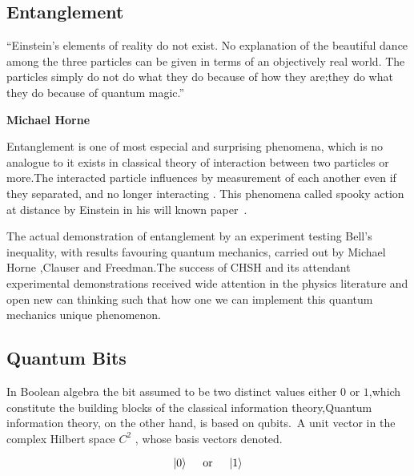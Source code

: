 \subsection{Entanglement}
\begin{center}
“Einstein’s elements of reality do not exist. No explanation of the beautiful dance among the 	three particles can be given in terms of an objectively real world. The particles
simply do not do what they do because of how they are;they do what they do because of quantum magic.”
\end{center}
\begin{flushright}
\textbf{Michael Horne}
\end{flushright}
Entanglement is one of most especial and surprising phenomena, which is no analogue to it exists in classical theory of  interaction between two particles or more\citep{PhysRevLett.78.5022}.The interacted particle influences by measurement of each another even if they separated,  and no longer interacting . This phenomena  called spooky action at distance by Einstein in his will known paper~\cite{EPR}.


The actual demonstration of entanglement by an experiment testing Bell’s inequality, with results favouring quantum mechanics, carried out by Michael Horne ,Clauser and Freedman\citep{PhysRevLett.23.880}.The success of CHSH and its attendant experimental demonstrations received wide attention in the physics literature and open new can thinking such that how one we can implement this quantum mechanics unique phenomenon.
\subsection{Quantum Bits}

In Boolean algebra the bit assumed to be  two distinct values either $0 $ or $1$,which constitute the building blocks of the classical information theory,Quantum information theory, on the other hand, is based on qubits.\citep{nielsen2002quantum}~A unit vector in the  complex Hilbert space $C^2$ , whose basis vectors denoted.

\begin{equation}
\ket{0}~~~~\text{or}~~~~ \ket{1}
\end{equation}

